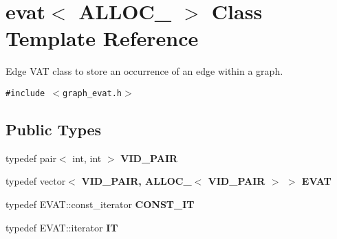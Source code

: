 \section{evat$<$ ALLOC\_\- $>$ Class Template Reference}
\label{classevat}
Edge VAT class to store an occurrence of an edge within a graph.  


{\tt \#include $<$graph\_\-evat.h$>$}

\subsection*{Public Types}
\begin{CompactItemize}
\item 
typedef pair$<$ int, int $>$ \bf{VID\_\-PAIR}
\item 
typedef vector$<$ \bf{VID\_\-PAIR}, ALLOC\_\-$<$ \bf{VID\_\-PAIR} $>$ $>$ \bf{EVAT}
\item 
typedef EVAT::const\_\-iterator \textbf{CONST\_\-IT}\label{classevat_62ddfae1b666abe2d249f77b4178e750}

\item 
typedef EVAT::iterator \textbf{IT}\label{classevat_d16b3e4754b4f556288b288bd953f260}

\end{CompactItemize}
